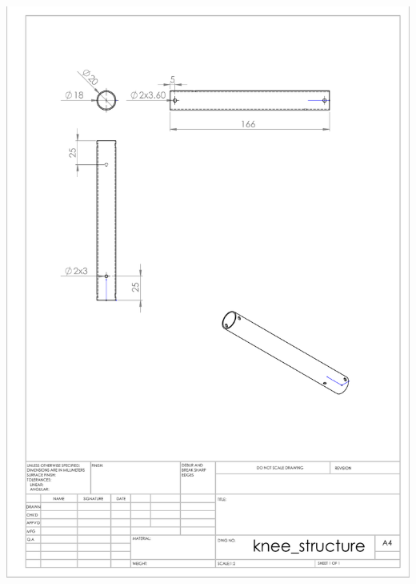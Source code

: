 \begin{appendices}
        \includegraphics[width=\linewidth]{chapters/cha_appendices/knee_structure}
        \break

\end{appendices}
